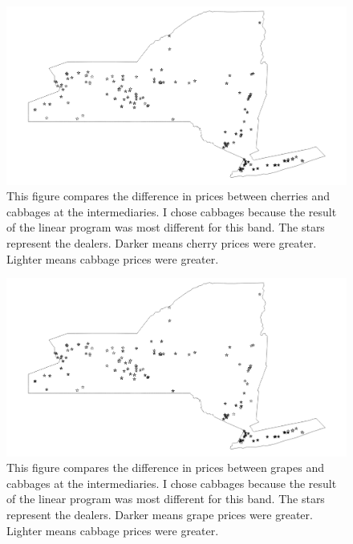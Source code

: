 \documentclass{report}
\begin{document}
\begin{figure}
\centering
\begin{framed}
\includegraphics[scale=.50]{procs_243_66}
\caption{This figure compares the difference in prices between cherries and cabbages at the intermediaries. I chose cabbages because the result of the linear program was most different for this band. The stars represent the dealers. Darker means cherry prices were greater. Lighter means cabbage prices were greater.}
\label{fig:procs_243_66}
\end{framed}
\end{figure}

\begin{figure}
\centering
\begin{framed}
\includegraphics[scale=.50]{procs_243_69}
\caption{This figure compares the difference in prices between grapes and cabbages at the intermediaries. I chose cabbages because the result of the linear program was most different for this band. The stars represent the dealers. Darker means grape prices were greater. Lighter means cabbage prices were greater.}
\label{fig:procs_243_69}
\end{framed}
\end{figure}
\end{document}
